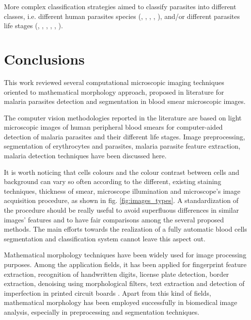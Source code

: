 \documentclass[sensors,review,submit,moreauthors,pdftex,10pt,a4paper]{mdpi}
\begin{document}
More complex classification strategies aimed to classify parasites into different classes, i.e. different human parasites species (\cite{Ahirwar2012}, \cite{Das2013}, \cite{Das2014}, \cite{Khan2011}, \cite{Tek2010}),
and/or different parasites life stages (\cite{Anggraini2011}, \cite{Das2013}, \cite{Das2014}, \cite{DiRuberto2002}, \cite{Diaz2009}, \cite{Tek2010}).


\section{Conclusions}
This work reviewed several computational microscopic imaging techniques oriented to mathematical morphology approach, proposed in literature for malaria parasites detection and segmentation in blood smear microscopic images.

The computer vision methodologies reported in the literature are based on light microscopic images of human peripheral blood smears for computer-aided detection of malaria parasites and their different life stages.
Image preprocessing, segmentation of erythrocytes and parasites, malaria parasite feature extraction, malaria detection techniques have been discussed here.

It is worth noticing that cells colours and the colour contrast between cells and background can vary so often according to the different, existing staining techniques, thickness of smear, microscope illumination and microscope's image acquisition procedure, as shown in fig. \ref{fig:images_types}. A standardization of the procedure should be really useful to avoid superfluous differences in similar images' features and to have fair comparisons among the several proposed methods. The main efforts towards the realization of a fully automatic blood cells segmentation and classification system cannot leave this aspect out.

Mathematical morphology techniques have been widely used for image processing purposes. Among the application fields, it has been applied for fingerprint feature extraction, recognition of handwritten digits, license plate detection, border extraction, denoising using morphological filters, text extraction and detection of imperfection in printed circuit boards \cite{Kaur2013}. Apart from this kind of fields, mathematical morphology has been employed successfully in biomedical image analysis, especially in preprocessing and segmentation techniques.
\end{document}
